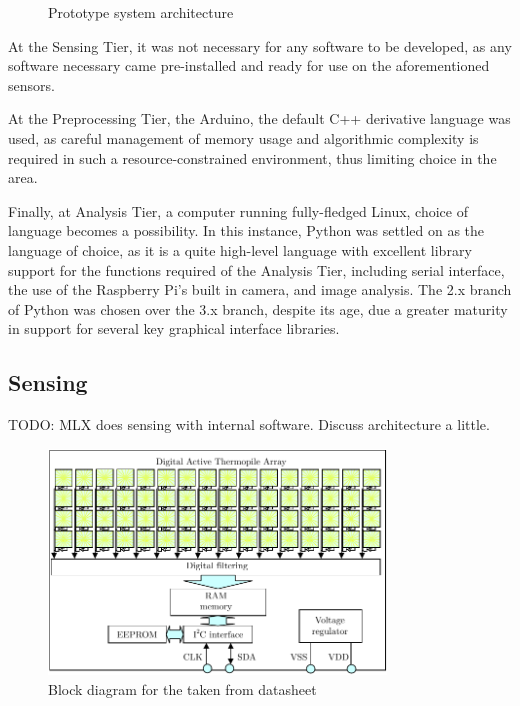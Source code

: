 \documentclass[../thesis/thesis.tex]{subfiles}
\begin{document}
\begin{figure}
\centering

\caption{Prototype system architecture}
\label{fig:pictures:protob-arch}
\end{figure}

At the Sensing Tier, it was not necessary for any software to be developed, as any software necessary came pre-installed and ready for use on the aforementioned sensors.

At the Preprocessing Tier, the Arduino, the default C++ derivative language was used, as careful management of memory usage and algorithmic complexity is required in such a resource-constrained environment, thus limiting choice in the area.

Finally, at Analysis Tier, a computer running fully-fledged Linux, choice of language becomes a possibility. In this instance, Python was settled on as the language of choice, as it is a quite high-level language with excellent library support for the functions required of the Analysis Tier, including serial interface, the use of the Raspberry Pi's built in camera, and image analysis. The 2.x branch of Python was chosen over the 3.x branch, despite its age, due a greater maturity in support for several key graphical interface libraries.

\subsection{Sensing}
TODO: MLX does sensing with internal software. Discuss architecture a little.

\begin{figure}
\centering
\includegraphics[width=0.8\textwidth]{../diagrams/mlx-block-diagram.pdf}
\caption{Block diagram for the \mlx taken from datasheet \cite{MLXDatasheet}}
\label{fig:exps:blockdia}
\end{figure}
\end{document}
